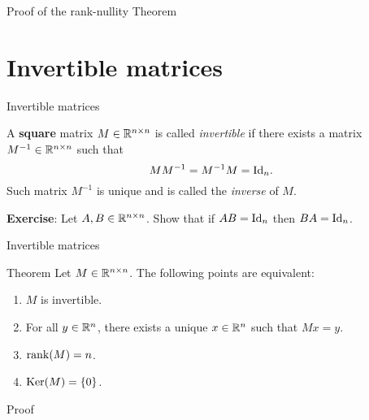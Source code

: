 \documentclass{beamer}
\begin{document}
\begin{frame}[t]{Proof of the rank-nullity Theorem}
	\grid

	\pause
	\pause
	\pause
	\pause
\end{frame}

\section{Invertible matrices}

\begin{frame}[t]{Invertible matrices}
	\grid

	\vspace{-0.3cm}

	\begin{definition}\label{prop:matrix_inverse}
		A \textbf{square} matrix $M \in \mathbb{R}^{n \times n}$ is called \emph{invertible} if there exists a matrix $M^{-1} \in \mathbb{R}^{n \times n}$ such that 
		$$
		M M^{-1} = M^{-1} M = {{\rm Id}}_n.
		$$
		Such matrix $M^{-1}$ is unique and is called the \emph{inverse} of $M$.
	\end{definition}
	\textbf{Exercise}: Let $A,B \in \mathbb{R}^{n \times n}$. Show that if $AB = {{\rm Id}}_n$ then $BA = {{\rm Id}}_n$.

\end{frame}

\begin{frame}[t]{Invertible matrices}
	\grid

	\vspace{-0.3cm}

	\begin{block}{Theorem}
		Let $M \in \mathbb{R}^{n \times n}$. The following points are equivalent:
		\begin{enumerate}
			\item \label{item:th_i} $M$ is invertible.
			\item For all $y \in \mathbb{R}^n$, there exists a unique $x \in \mathbb{R}^n$ such that $Mx=y$.
			\item \label{item:th_ii} ${{\rm rank}}(M) = n$.
			\item \label{item:th_iii} ${{\rm Ker}}(M) = \{0\}$.
		\end{enumerate}
	\end{block}

\end{frame}
\begin{frame}[t]{Proof}
	\grid

	\pause
	\pause
	\pause
\end{frame}
\end{document}
